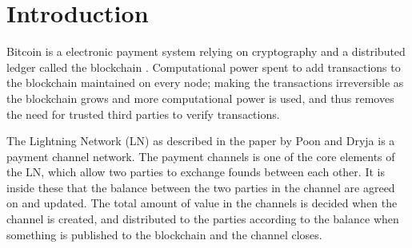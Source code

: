 \chapter{Introduction}
\label{chap:introduction}

Bitcoin is a electronic payment system relying on cryptography and a distributed ledger called the blockchain \cite{nakamoto2008}.
Computational power spent to add transactions to the blockchain maintained on every node; making the transactions irreversible as the blockchain grows and more computational power is used, and thus removes the need for trusted third parties to verify transactions.

The Lightning Network (LN) as described in the paper by Poon and Dryja \cite{poon2015bitcoin} is a payment channel network.
The payment channels is one of the core elements of the LN, which allow two parties to exchange founds between each other.
It is inside these that the balance between the two parties in the channel are agreed on and updated.
The total amount of value in the channels is decided when the channel is created, and distributed to the parties according to the balance when something is published to the blockchain and the channel closes.